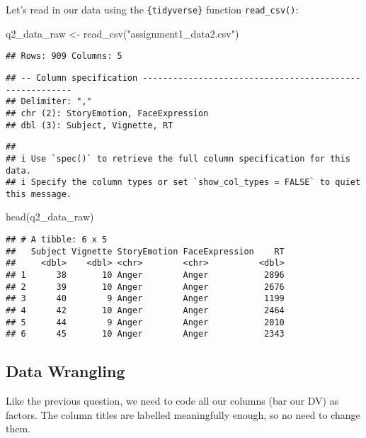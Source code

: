 \documentclass[
]{article}
\newenvironment{Shaded}{\begin{snugshade}}{\end{snugshade}}
\newcommand{\FunctionTok}[1]{\textcolor[rgb]{0.00,0.00,0.00}{#1}}
\newcommand{\NormalTok}[1]{#1}
\newcommand{\OtherTok}[1]{\textcolor[rgb]{0.56,0.35,0.01}{#1}}
\newcommand{\StringTok}[1]{\textcolor[rgb]{0.31,0.60,0.02}{#1}}
\begin{document}
Let's read in our data using the \texttt{\{tidyverse\}} function
\texttt{read\_csv()}:

\begin{Shaded}
\begin{Highlighting}[]
\NormalTok{q2\_data\_raw }\OtherTok{\textless{}{-}} \FunctionTok{read\_csv}\NormalTok{(}\StringTok{"assignment1\_data2.csv"}\NormalTok{)}
\end{Highlighting}
\end{Shaded}

\begin{verbatim}
## Rows: 909 Columns: 5
\end{verbatim}

\begin{verbatim}
## -- Column specification --------------------------------------------------------
## Delimiter: ","
## chr (2): StoryEmotion, FaceExpression
## dbl (3): Subject, Vignette, RT
\end{verbatim}

\begin{verbatim}
## 
## i Use `spec()` to retrieve the full column specification for this data.
## i Specify the column types or set `show_col_types = FALSE` to quiet this message.
\end{verbatim}

\begin{Shaded}
\begin{Highlighting}[]
\FunctionTok{head}\NormalTok{(q2\_data\_raw)}
\end{Highlighting}
\end{Shaded}

\begin{verbatim}
## # A tibble: 6 x 5
##   Subject Vignette StoryEmotion FaceExpression    RT
##     <dbl>    <dbl> <chr>        <chr>          <dbl>
## 1      38       10 Anger        Anger           2896
## 2      39       10 Anger        Anger           2676
## 3      40        9 Anger        Anger           1199
## 4      42       10 Anger        Anger           2464
## 5      44        9 Anger        Anger           2010
## 6      45       10 Anger        Anger           2343
\end{verbatim}

\hypertarget{data-wrangling-1}{%
\subsection{Data Wrangling}\label{data-wrangling-1}}

Like the previous question, we need to code all our columns (bar our DV)
as factors. The column titles are labelled meaningfully enough, so no
need to change them.
\end{document}
